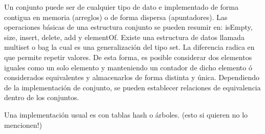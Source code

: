 Un conjunto puede ser de cualquier tipo de dato e implementado de forma contigua en memoria (arreglos) o de forma dispersa (apuntadores). Las operaciones básicas de una estructura conjunto se pueden resumir en: isEmpty, size, insert, delete, add y elementOf.
Existe una estructura de datos llamada multiset o bag la cual es una generalización del tipo set. La diferencia radica en que permite repetir valores. De esta forma, es posible considerar dos elementos iguales como un solo elemento y manteniendo un contador de dicho elemento ó considerados equivalentes y almacenarlos de forma distinta y única. Dependiendo de la implementación de conjunto, se pueden establecer relaciones de equivalencia dentro de los conjuntos. 

Una implementación usual es con tablas hash o árboles. (esto si quieren no lo mencionen!)
